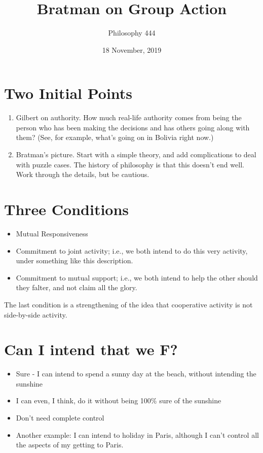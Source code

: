 \documentclass[11pt,]{article}
\title{Bratman on Group Action}
\author{Philosophy 444}
\date{18 November, 2019}
\providecommand{\tightlist}{%
  \setlength{\itemsep}{0pt}\setlength{\parskip}{0pt}}
\begin{document}
\maketitle

\hypertarget{two-initial-points}{%
\section{Two Initial Points}\label{two-initial-points}}

\begin{enumerate}
\def\labelenumi{\arabic{enumi}.}
\tightlist
\item
  Gilbert on authority. How much real-life authority comes from being
  the person who has been making the decisions and has others going
  along with them? (See, for example, what's going on in Bolivia right
  now.)
\item
  Bratman's picture. Start with a simple theory, and add complications
  to deal with puzzle cases. The history of philosophy is that this
  doesn't end well. Work through the details, but be cautious.
\end{enumerate}

\hypertarget{three-conditions}{%
\section{Three Conditions}\label{three-conditions}}

\begin{itemize}
\tightlist
\item
  Mutual Responsiveness
\item
  Commitment to joint activity; i.e., we both intend to do this very
  activity, under something like this description.
\item
  Commitment to mutual support; i.e., we both intend to help the other
  should they falter, and not claim all the glory.
\end{itemize}

The last condition is a strengthening of the idea that cooperative
activity is not side-by-side activity.

\hypertarget{can-i-intend-that-we-f}{%
\section{Can I intend that we F?}\label{can-i-intend-that-we-f}}

\begin{itemize}
\tightlist
\item
  Sure - I can intend to spend a sunny day at the beach, without
  intending the sunshine
\item
  I can even, I think, do it without being 100\% sure of the sunshine
\item
  Don't need complete control
\item
  Another example: I can intend to holiday in Paris, although I can't
  control all the aspects of my getting to Paris.
\end{itemize}
\end{document}
